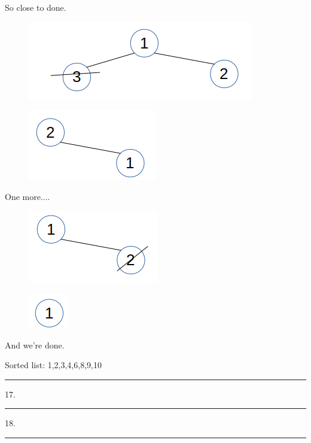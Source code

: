 \documentclass{article}
\begin{document}
So close to done. 

\begin{figure}[H]
\includegraphics[scale=0.5]{./P16/r3}
\centering
\end{figure}

\begin{figure}[H]
\includegraphics[scale=0.5]{./P16/m2}
\centering
\end{figure}

One more....

\begin{figure}[H]
\includegraphics[scale=0.5]{./P16/r2}
\centering
\end{figure}


\begin{figure}[H]
\includegraphics[scale=0.5]{./P16/m1}
\centering
\end{figure}

And we're done. 

Sorted list: 
1,2,3,4,6,8,9,10




\noindent\rule{8cm}{0.4pt}

17. 


\noindent\rule{8cm}{0.4pt}


18. 


\noindent\rule{8cm}{0.4pt}
\end{document}

